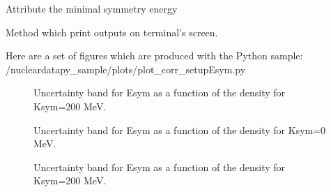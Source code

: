 \documentclass[letterpaper,10pt,english]{sphinxmanual}
\begin{document}
\begin{fulllineitems}
\begin{fulllineitems}
\label{\detokenize{source/api/setup_corr_Esym:nucleardatapy.corr.setup_Esym.setupEsym.esym_e2a_min}}
\pysigstartsignatures
{}
\pysigstopsignatures
\sphinxAtStartPar
Attribute the minimal symmetry energy

\end{fulllineitems}


\begin{fulllineitems}
\label{\detokenize{source/api/setup_corr_Esym:nucleardatapy.corr.setup_Esym.setupEsym.print_outputs}}
\pysigstartsignatures
{}
\pysigstopsignatures
\sphinxAtStartPar
Method which print outputs on terminal’s screen.

\end{fulllineitems}


\end{fulllineitems}


\sphinxAtStartPar
Here are a set of figures which are produced with the Python sample: /nucleardatapy\_sample/plots/plot\_corr\_setupEsym.py

\begin{figure}[htbp]
\centering
\capstart

\noindent{}
\caption{Uncertainty band for Esym as a function of the density for Ksym=\sphinxhyphen{}200 MeV.}\label{\detokenize{source/api/setup_corr_Esym:id1}}\end{figure}

\begin{figure}[htbp]
\centering
\capstart

\noindent{}
\caption{Uncertainty band for Esym as a function of the density for Ksym=0 MeV.}\label{\detokenize{source/api/setup_corr_Esym:id2}}\end{figure}

\begin{figure}[htbp]
\centering
\capstart

\noindent{}
\caption{Uncertainty band for Esym as a function of the density for Ksym=200 MeV.}\label{\detokenize{source/api/setup_corr_Esym:id3}}\end{figure}
\end{document}
